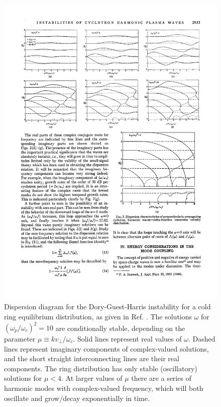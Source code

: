 \documentclass[%
 reprint,
 amsmath,amssymb,
 aps,
]{revtex4-2}
\begin{document}
\begin{figure}
\includegraphics[width=\linewidth]{proj4/dispersion-dgh.pdf}
\caption{\label{fig:dgh-dispersion}Dispersion diagram for the Dory-Guest-Harris instability for a cold ring equilibrium distribution, as given in Ref. \cite{CrawfordF.W1965AIoP}. The solutions $\omega$ for $(\omega_p / \omega _c)^2= 10$ are conditionally stable, depending on the parameter $\mu \equiv k v_\perp / \omega_c$. Solid lines represent real values of $\omega$. Dashed lines represent imaginary components of complex-valued solutions, and the short straight interconnecting lines are their real components. The ring distribution has only stable (oscillatory) solutions for $\mu < 4$. At larger values of $\mu$ there are a series of harmonic modes with complex-valued frequency, which will both oscillate and grow/decay exponentially in time.}
\end{figure}
\end{document}
